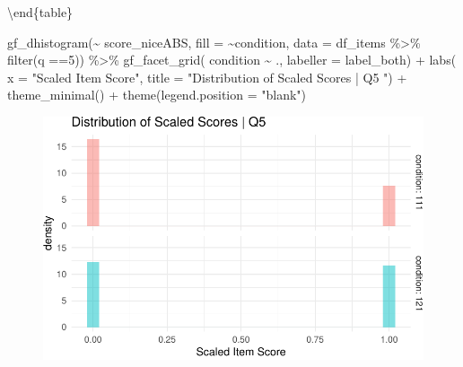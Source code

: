 \documentclass[
  letterpaper,
  DIV=11,
  numbers=noendperiod]{scrreprt}
\newenvironment{Shaded}{\begin{snugshade}}{\end{snugshade}}
\newcommand{\AttributeTok}[1]{\textcolor[rgb]{0.40,0.45,0.13}{#1}}
\newcommand{\DecValTok}[1]{\textcolor[rgb]{0.68,0.00,0.00}{#1}}
\newcommand{\FunctionTok}[1]{\textcolor[rgb]{0.28,0.35,0.67}{#1}}
\newcommand{\NormalTok}[1]{\textcolor[rgb]{0.00,0.23,0.31}{#1}}
\newcommand{\SpecialCharTok}[1]{\textcolor[rgb]{0.37,0.37,0.37}{#1}}
\newcommand{\StringTok}[1]{\textcolor[rgb]{0.13,0.47,0.30}{#1}}
\begin{document}
\textbackslash end\{table\}

\begin{Shaded}
\begin{Highlighting}[]
\FunctionTok{gf\_dhistogram}\NormalTok{(}\SpecialCharTok{\textasciitilde{}}\NormalTok{ score\_niceABS, }\AttributeTok{fill =} \SpecialCharTok{\textasciitilde{}}\NormalTok{condition, }\AttributeTok{data =}\NormalTok{ df\_items }\SpecialCharTok{\%\textgreater{}\%} \FunctionTok{filter}\NormalTok{(q }\SpecialCharTok{==}\DecValTok{5}\NormalTok{)) }\SpecialCharTok{\%\textgreater{}\%} 
  \FunctionTok{gf\_facet\_grid}\NormalTok{( condition }\SpecialCharTok{\textasciitilde{}}\NormalTok{ ., }\AttributeTok{labeller =}\NormalTok{ label\_both) }\SpecialCharTok{+} 
  \FunctionTok{labs}\NormalTok{( }\AttributeTok{x =} \StringTok{"Scaled Item Score"}\NormalTok{, }\AttributeTok{title =} \StringTok{"Distribution of Scaled Scores | Q5 "}\NormalTok{) }\SpecialCharTok{+} 
  \FunctionTok{theme\_minimal}\NormalTok{() }\SpecialCharTok{+} \FunctionTok{theme}\NormalTok{(}\AttributeTok{legend.position =} \StringTok{"blank"}\NormalTok{)}
\end{Highlighting}
\end{Shaded}

\begin{figure}[H]

{\centering \includegraphics{analysis/SGC3A/2_sgc3A_scoring_files/figure-pdf/Q5-distribution-1.pdf}

}

\end{figure}
\end{document}
